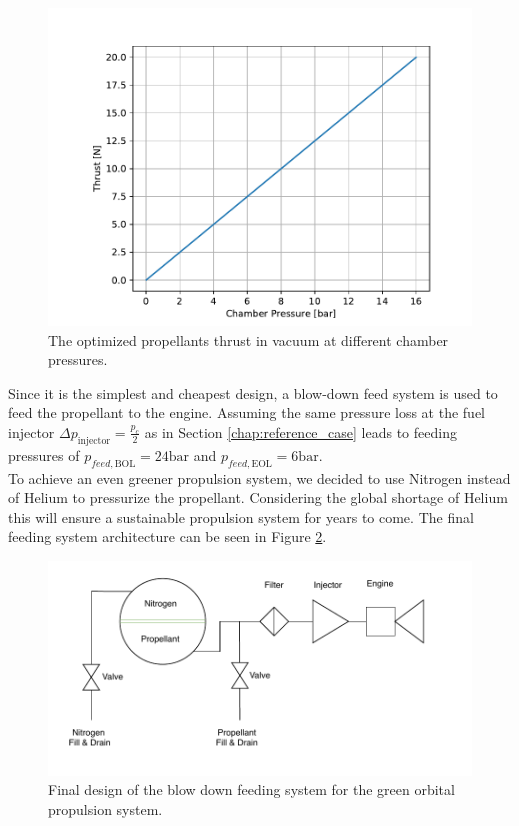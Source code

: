 \documentclass[12pt]{article}
\begin{document}
\begin{figure}[h]
	\centering
	\includegraphics[width=0.8\linewidth]{figures/thrust_vs_pc.pdf}
	\caption{The optimized propellants thrust in vacuum at different chamber pressures.}
	\label{fig:thrust_vs_pc}
\end{figure}

Since it is the simplest and cheapest design, a blow-down feed system is used to feed the propellant to the engine. Assuming the same pressure loss at the fuel injector $\Delta p_{\text{injector}}= \frac{p_c}{2}$ as in Section \ref{chap:reference_case} leads to feeding pressures of $p_{feed,\text{BOL}}=24\text{bar}$ and $p_{feed,\text{EOL}}=6\text{bar}$.\\

To achieve an even greener propulsion system, we decided to use Nitrogen instead of Helium to pressurize the propellant. Considering the global shortage of Helium this will ensure a sustainable propulsion system for years to come. The final feeding system architecture can be seen in Figure \ref{fig:blowdown_design}.\\

\begin{figure}[h]
	\centering
	\includegraphics[width=\linewidth]{figures/blowdown_design.pdf}
	\caption{Final design of the blow down feeding system for the green orbital propulsion system.}
	\label{fig:blowdown_design}
\end{figure}
\end{document}
